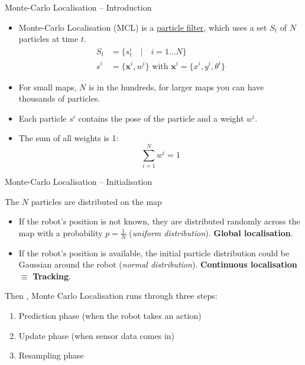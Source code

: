 \documentclass[compress]{beamer}
\begin{document}

\begin{frame}{Monte-Carlo Localisation -- Introduction}

    \begin{itemize}
        \item Monte-Carlo Localisation (MCL) is a \href{http://en.wikipedia.org/wiki/Particle_filter}{particle
            filter}, which uses a set $S_t$ of $N$ particles at time
            $t$.
            \large
            \begin{align*}
                S_t &= \{s_t^i \quad|\quad i = 1\ldots N\} \\
                s^i &= \{\mathbf{x}^i, w^i\} \text{ with } \mathbf{x}^i = \{x^i, y^i, \theta^i\}
            \end{align*}
            \normalsize
        \item<+-> For small maps, $N$ is in the hundreds, for larger maps you
            can have thousands of particles.
        \item<+-> Each particle $s^i$ contains the pose of the particle and a weight $w^i$.
        \item<+-> The sum of all weights is 1: \[ \sum_{i=1}^N w^i = 1 \]
    \end{itemize}

\end{frame}

\begin{frame}{Monte-Carlo Localisation -- Initialisation}

    The $N$ particles are distributed on the map

    \begin{itemize}
        \item If the robot's position is not known, they are distributed randomly
            across the map with a probability $p=\frac{1}{N}$ (\emph{uniform
            distribution}). \textbf{Global localisation}.
            \pause
        \item If the robot's position is available, the initial particle
            distribution could be Gaussian around the robot (\emph{normal
            distribution}). \textbf{Continuous localisation} $\equiv$
            \textbf{Tracking}.
    \end{itemize}

    \pause 

    Then , Monte Carlo Localisation runs through three steps:

    \begin{enumerate}
        \item Prediction phase (when the robot takes an action)
        \item Update phase (when sensor data comes in)
        \item Resampling phase
    \end{enumerate}

\end{frame}
\end{document}
